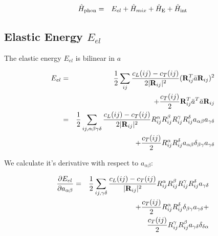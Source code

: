 \begin{eqnarray}
\hat H_{\rm phon}& =&E_{el} +\hat  H_{mix}+\hat  H_{\rm E}+\hat H_{\rm int}
\end{eqnarray}

\subsection{Elastic Energy $E_{el}$}

The elastic energy $E_{el}$ is bilinear in  $a$

\begin{eqnarray}\label{Eel}
E_{el} &=& \frac{1}{2}\sum_{ij} \frac{c_L(ij)-c_T(ij)}{2|\mathbf R_{ij}|^2} 
(\mathbf R_{ij}^T\bar a \mathbf R_{ij})^2  \\
      && + \frac{c_T(ij)}{2} \mathbf R_{ij}^T\bar a^T\bar a \mathbf R_{ij} \nonumber \\
&=& \frac{1}{2} \sum_{ij,\alpha\beta\gamma\delta} \frac{c_L(ij)-c_T(ij)}{2|\mathbf R_{ij}|^2} 
R_{ij}^{\alpha}R_{ij}^{\beta}R_{ij}^{\gamma}R_{ij}^{\delta}
a_{\alpha\beta}a_{\gamma\delta} \nonumber \\
&& + \frac{c_T(ij)}{2} R_{ij}^{\alpha} R_{ij}^{\delta}
a_{\alpha\beta} \delta_{\beta\gamma} a_{\gamma\delta}  \nonumber
\end{eqnarray}

We calculate it's derivative with respect to $a_{\alpha\beta}$:

\begin{eqnarray}
\frac{\partial E_{el}}{\partial a_{\alpha\beta}}&=& \frac{1}{2}\sum_{ij,\gamma\delta} \frac{c_L(ij)-c_T(ij)}{|\mathbf R_{ij}|^2} 
R_{ij}^{\alpha}R_{ij}^{\beta}R_{ij}^{\gamma}R_{ij}^{\delta}
a_{\gamma\delta} \nonumber \\
&& +    \frac{c_T(ij)}{2} R_{ij}^{\alpha}R_{ij}^{\delta}
 \delta_{\beta\gamma} a_{\gamma\delta} + \nonumber \\
&& \frac{c_T(ij)}{2} R_{ij}^{\gamma} R_{ij}^{\beta}
a_{\gamma\delta} \delta_{\delta\alpha} 
\end{eqnarray}




